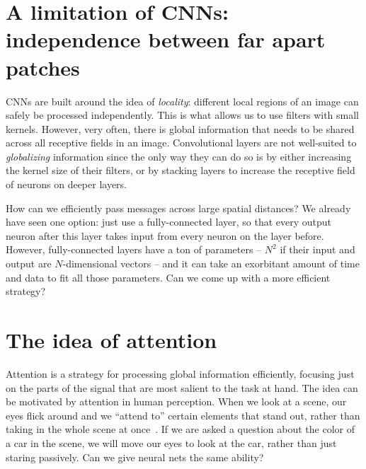 

\section{A limitation of CNNs: independence between far apart patches}
CNNs are built around the idea of \textit{locality}: different local regions of an image can safely be processed independently. This is what allows us to use filters with small kernels. However, very often, there is global information that needs to be shared across all receptive fields in an image. Convolutional layers are not well-suited to \textit{globalizing} information since the only way they can do so is by either increasing the kernel size of their filters, or by stacking layers to increase the receptive field of neurons on deeper layers.

How can we efficiently pass messages across large spatial distances? We already have seen one option: just use a fully-connected layer, so that every output neuron after this layer takes input from every neuron on the layer before. However, fully-connected layers have a ton of parameters -- $N^2$ if their input and output are $N$-dimensional vectors -- and it can take an exorbitant amount of time and data to fit all those parameters. Can we come up with a more efficient strategy?


\section{The idea of attention}
Attention is a strategy for processing global information efficiently, focusing just on the parts of the signal that are most salient to the task at hand. The idea can be motivated by attention in human perception. When we look at a scene, our eyes flick around and we ``attend to'' certain elements that stand out, rather than taking in the whole scene at once~\cite{wolfe2000visual}. If we are asked a question about the color of a car in the scene, we will move our eyes to look at the car, rather than just staring passively. Can we give neural nets the same ability?

